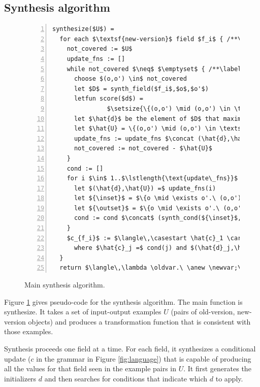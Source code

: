 \documentclass[natbib,10pt]{sigplanconf}
\begin{document}
\subsection{Synthesis algorithm}

\begin{figure}
\hspace*{.05in}
\begin{minipage}{4.3in}
\begin{lstlisting}[numbers=left]
synthesize($U$) =
  for each $\textsf{new-version}$ field $f_i$ { /**\label{line:path1}*/
    not_covered := $U$
    update_fns := []
    while not_covered $\neq$ $\emptyset$ { /**\label{line:not-covered-loop}*/
      choose $(o,o') \in$ not_covered
      let $D$ = synth_field($f_i$,$o$,$o'$)
      letfun score($d$) =
               $\setsize{\{(o,o') \mid (o,o') \in \textsf{not\_covered} \wedge o'.f_i = d(o)\}}$
      let $\hat{d}$ be the element of $D$ that maximizes score /**\label{line:maxscored}*/
      let $\hat{U} = \{(o,o') \mid (o,o') \in \textsf{not\_covered} \wedge o'.f_i = \hat{d}(o)\}$
      update_fns := update_fns $\concat (\hat{d},\hat{U})$
      not_covered := not_covered - $\hat{U}$
    }
    cond := []
    for i $\in$ 1..$\lstlength{\text{update\_fns}}$ { /**\label{line:discover-condition-loop}*/
      let $(\hat{d},\hat{U}) =$ update_fns(i)
      let ${\inset}$ = $\{o \mid \exists o'.\ (o,o') \in U \wedge (o,o') \in \hat{U}\}$
      let ${\outset}$ = $\{o \mid \exists o'.\ (o,o') \in U \wedge (o,o') \not\in \hat{U}\}$
      cond := cond $\concat$ (synth_cond(${\inset}$,${\outset}$))
    }
    $c_{f_i}$ := $\langle\,\casestart \hat{c}_1 \carrow \hat{d}_1, \ldots, \hat{c}_n \carrow \hat{d}_n \caseend\,\rangle$
      where $\hat{c}_j =$ cond(j) and $(\hat{d}_j,\hat{U}_j) =$ update_fns(j)
  }
  return $\langle\,\lambda \oldvar.\ \anew \newvar;\; \newvar.f_1 := c_{f_1};\ \ldots;\ \newvar.f_n := c_{f_n};\ \return\ \newvar\rangle$
\end{lstlisting}
\end{minipage}
\caption{Main synthesis algorithm.\label{fig:synthesis}}
\end{figure}

Figure \ref{fig:synthesis} gives pseudo-code for the synthesis
algorithm.  The main function is \textsf{synthesize}.  It takes a
set of input-output examples $U$ (pairs of old-version, new-version objects)
and produces a transformation function that
is consistent with those examples.

Synthesis proceeds one field at a time.  For each field,  it synthesizes a
conditional update ($c$ in the grammar in Figure \ref{fig:language}) that
is capable of producing all the values for that field seen in the example
pairs in $U$.  It first generates the initializers $d$ and then
searches for conditions that indicate which $d$ to apply.
\end{document}
